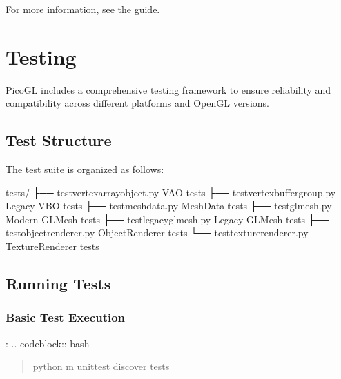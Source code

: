 \documentclass[a4paper,10pt,english,openany,oneside]{sphinxmanual}
\begin{document}
\sphinxAtStartPar
For more information, see the {\hyperref[\detokenize{troubleshooting::doc}]{}} guide.

\sphinxstepscope


\section{Testing}
\label{\detokenize{testing:testing}}\label{\detokenize{testing::doc}}
\sphinxAtStartPar
PicoGL includes a comprehensive testing framework to ensure reliability and compatibility across different platforms and OpenGL versions.


\subsection{Test Structure}
\label{\detokenize{testing:test-structure}}
\sphinxAtStartPar
The test suite is organized as follows:

\begin{sphinxVerbatim}[commandchars=\\\{\}]
tests/
├── test\PYGZus{}vertex\PYGZus{}array\PYGZus{}object.py      \PYGZsh{} VAO tests
├── test\PYGZus{}vertex\PYGZus{}buffer\PYGZus{}group.py      \PYGZsh{} Legacy VBO tests
├── test\PYGZus{}meshdata.py                 \PYGZsh{} MeshData tests
├── test\PYGZus{}glmesh.py                   \PYGZsh{} Modern GLMesh tests
├── test\PYGZus{}legacy\PYGZus{}glmesh.py            \PYGZsh{} Legacy GLMesh tests
├── test\PYGZus{}object\PYGZus{}renderer.py          \PYGZsh{} ObjectRenderer tests
└── test\PYGZus{}texture\PYGZus{}renderer.py         \PYGZsh{} TextureRenderer tests
\end{sphinxVerbatim}


\subsection{Running Tests}
\label{\detokenize{testing:running-tests}}

\subsubsection{Basic Test Execution}
\label{\detokenize{testing:basic-test-execution}}
\sphinxAtStartPar
{}:
.. code\sphinxhyphen{}block:: bash
\begin{quote}

\sphinxAtStartPar
python \sphinxhyphen{}m unittest discover tests
\end{quote}
\end{document}
